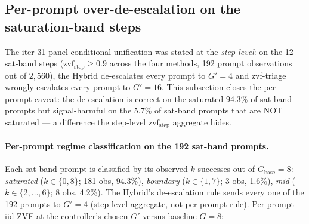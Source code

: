 \subsection{Per-prompt over-de-escalation on the saturation-band steps}
\label{sec:p7-satband-perprompt}

The iter-31 panel-conditional unification was stated at the
\emph{step level}: on the 12 sat-band steps
($\mathrm{zvf}_\text{step} \ge 0.9$ across the four methods,
192 prompt observations out of $2{,}560$), the Hybrid de-escalates
every prompt to $G'=4$ and zvf-triage wrongly escalates every prompt
to $G'=16$. This subsection closes the per-prompt caveat: the
de-escalation is correct on the saturated 94.3\% of sat-band prompts
but signal-harmful on the 5.7\% of sat-band prompts that are NOT
saturated --- a difference the step-level $\mathrm{zvf}_\text{step}$
aggregate hides.

\paragraph{Per-prompt regime classification on the 192 sat-band
prompts.}
Each sat-band prompt is classified by its observed $k$ successes out of
$G_\text{base}{=}8$: \emph{saturated} ($k \in \{0, 8\}$; 181 obs,
94.3\%), \emph{boundary} ($k \in \{1, 7\}$; 3 obs, 1.6\%),
\emph{mid} ($k \in \{2, \dots, 6\}$; 8 obs, 4.2\%). The Hybrid's
de-escalation rule sends every one of the 192 prompts to $G'=4$
(step-level aggregate, not per-prompt rule). Per-prompt iid-ZVF at
the controller's chosen $G'$ versus baseline $G{=}8$:

\begin{table}[t]
\centering
\caption{Per-prompt iid-ZVF at the controller's chosen $G'$
versus the fixed-$G{=}8$ baseline, on the 192 sat-band prompts.
Positive $\Delta\mathrm{ZVF}$ means the controller's choice \emph{worsens}
signal (higher iid-ZVF = more starvation). The Hybrid's de-escalation
is signal-preserving on the 181 saturated prompts (ZVF$=1.0$ either
way) and signal-harmful on the 11 mixed prompts.}
\label{tab:p7-satband-perprompt}
\end{table}

